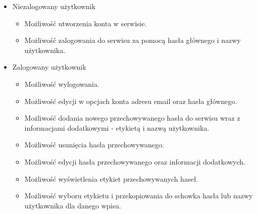 \documentclass{article}
\begin{document}
    \begin{itemize}
		\item Niezalogowany użytkownik
			\begin{itemize}
				\item Możliwość utworzenia konta w serwisie.
				\item Możliwość zalogowania do serwisu za pomocą hasła głównego i nazwy użytkownika.
			\end{itemize}

		\item Zalogowany użytkownik
			\begin{itemize}
				\item Możliwość wylogowania.
				\item Możliwość edycji w opcjach konta adresu email oraz hasła  głównego.
				\item Możliwość dodania nowego przechowywanego hasła do serwisu wraz z informacjami dodatkowymi - etykietą i nazwą użytkownika.
				\item Możliwość usunięcia hasła przechowywanego.
				\item Możliwość edycji hasła przechowywanego oraz informacji dodatkowych.
				\item Możliwość wyświetlenia etykiet przechowywanych haseł.
				\item Możliwość wyboru etykietu i przekopiowania do schowka hasła lub nazwy użytkownika dla danego wpisu.
			\end{itemize}
	\end{itemize}
\end{document}
